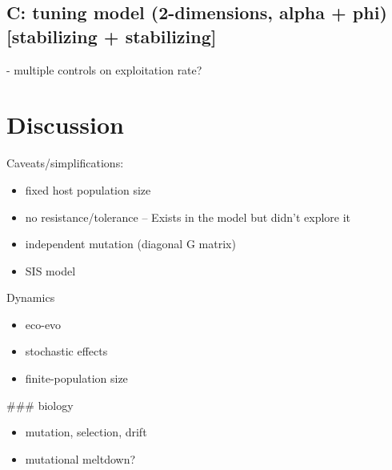 \subsection*{C: tuning model (2-dimensions, alpha + phi) [stabilizing + stabilizing]}         - multiple controls on exploitation rate?

\section*{Discussion}

Caveats/simplifications:

\begin{itemize}
    \item fixed host population size
    \item no resistance/tolerance
        -- Exists in the model but didn't explore it
    \item independent mutation (diagonal G matrix)
    \item SIS model
\end{itemize}

Dynamics

\begin{itemize}
    \item eco-evo
    \item stochastic effects
    \item finite-population size
\end{itemize}

### biology

\begin{itemize}
    \item mutation, selection, drift
    \item mutational meltdown?
\end{itemize}
